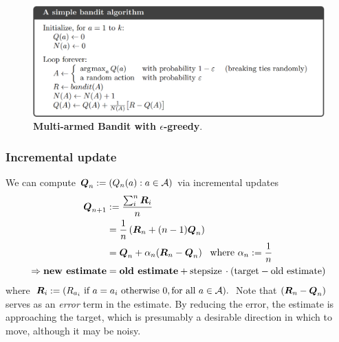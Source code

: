 \documentclass[11pt]{article}
\begin{document}
\begin{figure}
\begin{minipage}[t]{1\linewidth}
  \centering
  \centerline{\includegraphics[scale = 0.3]{MAB_epsilon_greedy_algo.png}}
\end{minipage}
\caption{\footnotesize{\textbf{Multi-armed Bandit with $\epsilon$-greedy}.  \citep{sutton2018reinforcement}}}
\label{fig: MAB_epsilon_greedy_algo}
\end{figure}

\subsubsection{Incremental update}
We can compute $\boldsymbol{Q}_n:= (Q_n(a): a\in {\mathcal A} )$ via incremental updates
\begin{align}
\boldsymbol{Q}_{n+1} &:= \frac{\sum_i^{n} \boldsymbol{R}_{i}}{n} \nonumber\\
&= \frac{1}{n}\left(\boldsymbol{R}_n + (n-1) \boldsymbol{Q}_{n}\right)\nonumber\\
&= \boldsymbol{Q}_{n} + \alpha_n(\boldsymbol{R}_n - \boldsymbol{Q}_n)\;\;\; \text{where }\alpha_n :=\frac{1}{n} \label{eqn: increment_update}\\
\Rightarrow \text{\textbf{new estimate}}&=\text{\textbf{old estimate}} + \text{stepsize}\,\cdot (\text{target} - \text{old estimate})
\end{align} where $\boldsymbol{R}_{i}:= (R_{a_{i}}\text{ if }a=a_{i}\text{ otherwise } 0, \text{for all }a\in {\mathcal A} ).$ Note that $(\boldsymbol{R}_n - \boldsymbol{Q}_n)$ serves as an \emph{error} term in the estimate. By reducing the error, the estimate is approaching the target, which is presumably a desirable direction in which to move, although it may be noisy. 
\end{document}
